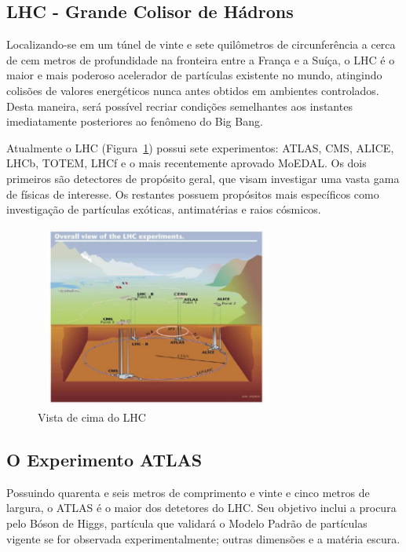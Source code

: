 \documentclass[a4paper,10pt,titlepage]{article}
\begin{document}
\subsection{LHC - Grande Colisor de Hádrons}

Localizando-se em um túnel de vinte e sete quilômetros de circunferência a cerca de cem metros de profundidade na fronteira entre a França e a Suíça, o LHC \cite{LHC} é o maior e mais poderoso acelerador de partículas existente no mundo, atingindo colisões de valores energéticos nunca antes obtidos em ambientes controlados.
Desta maneira, será possível recriar condições semelhantes aos instantes imediatamente posteriores ao fenômeno do Big Bang.

Atualmente o LHC (Figura~\ref{fig:top_view_lhc}) possui sete experimentos: ATLAS, CMS, ALICE, LHCb, TOTEM, LHCf e o mais recentemente aprovado MoEDAL.
Os dois primeiros são detectores de propósito geral, que visam investigar uma vasta gama de físicas de interesse. Os restantes possuem propósitos mais específicos como investigação de partículas exóticas, antimatérias e raios cósmicos.

\begin{figure}[htbp!]
 \centering
 \includegraphics[width=8cm,height=6cm]{Figs/atlas/top_view_lhc.pdf}
 \caption{Vista de cima do LHC}
 \label{fig:top_view_lhc}
\end{figure}

\subsection{O Experimento ATLAS}

Possuindo quarenta e seis metros de comprimento e vinte e cinco metros de largura, o ATLAS \cite{ATLAS} é o maior dos detetores do LHC. Seu objetivo inclui a procura pelo Bóson de Higgs, partícula que validará o Modelo Padrão de partículas vigente se for observada experimentalmente; outras dimensões e a matéria escura.
\end{document}
